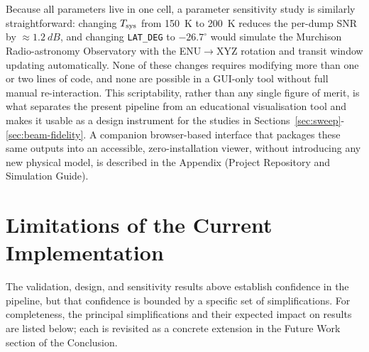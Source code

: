 Because all parameters live in one cell, a parameter sensitivity study is
similarly straightforward: changing $T_{\rm sys}$ from \SI{150}{\kelvin} to
\SI{200}{\kelvin} reduces the per-dump SNR by $\approx1.2~\si{dB}$, and changing
\texttt{LAT\_DEG} to $-26.7^\circ$ would simulate the Murchison Radio-astronomy
Observatory with the ENU$\rightarrow$XYZ rotation and transit window updating
automatically. None of these changes requires modifying more than one or two lines of
code, and none are possible in a GUI-only tool without full manual re-interaction.
This scriptability, rather than any single figure of merit, is what separates the
present pipeline from an educational visualisation tool and makes it usable as a
design instrument for the studies in Sections~\ref{sec:sweep}-\ref{sec:beam-fidelity}.
A companion browser-based interface that packages these same outputs into an
accessible, zero-installation viewer, without introducing any new physical model, is
described in the Appendix (Project Repository and Simulation Guide).

\section{Limitations of the Current Implementation}
\label{sec:limitations}

The validation, design, and sensitivity results above establish confidence in the
pipeline, but that confidence is bounded by a specific set of simplifications. For
completeness, the principal simplifications and their expected impact on results
are listed below; each is revisited as a concrete extension in the Future Work
section of the Conclusion.

